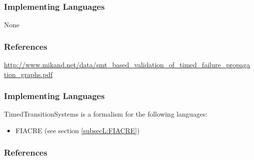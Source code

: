 \subsubsection{Implementing Languages}

None


\subsubsection{References}


\url{http://www.mikand.net/data/smt_based_validation_of_timed_failure_propagation_graphs.pdf}










\subsubsection{Implementing Languages}

TimedTransitionSystems is a formalism for the following languages:
\begin{itemize}
	\item FIACRE (see section \ref{subsecL:FIACRE})
\end{itemize}


\subsubsection{References}














